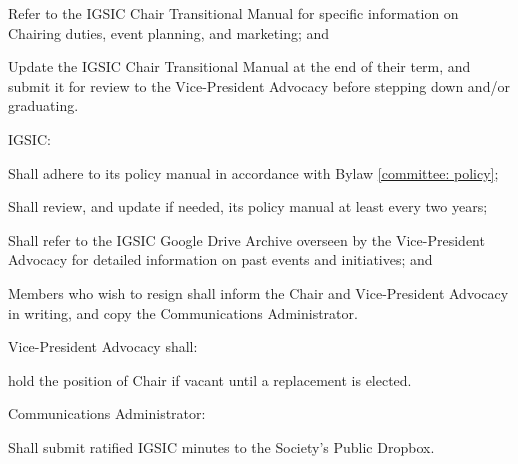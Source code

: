 \begin{longenum}[ label*=\thesubsection.\arabic*., align=left]
\begin{longenum}[ label*=\arabic*., align=left]
\begin{longenum}[ label*=\arabic*., align=left]
		\item Refer to the IGSIC Chair Transitional Manual for specific information on Chairing duties, event planning, and marketing; and
		\item Update the IGSIC Chair Transitional Manual at the end of their term, and submit it for review to the Vice-President Advocacy before stepping down and/or graduating.
	\end{longenum}
	\item IGSIC:
	\begin{longenum}[ label*=\arabic*., align=left]
		\item Shall adhere to its policy manual in accordance with Bylaw \ref{committee: policy};
		\item Shall review, and update if needed, its policy manual at least every two years;
		\item Shall refer to the IGSIC Google Drive Archive overseen by the Vice-President Advocacy for detailed information on past events and initiatives; and
		\item Members who wish to resign shall inform the Chair and	Vice-President Advocacy in writing, and copy the Communications Administrator.
	\end{longenum}
	\item Vice-President Advocacy shall:
	\begin{longenum}[ label*=\arabic*., align=left]
		\item hold the position of Chair if vacant until a replacement is elected.
	\end{longenum}
	\item Communications Administrator:
	\begin{longenum}[ label*=\arabic*., align=left]
		\item Shall submit ratified IGSIC minutes to the Society’s Public Dropbox.
	\end{longenum}
\end{longenum}
\end{longenum}

